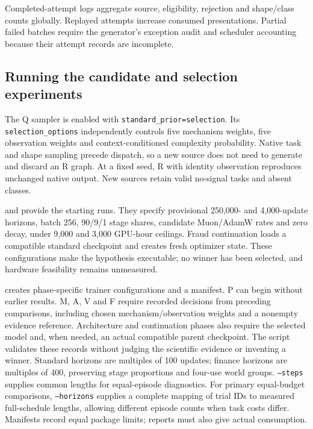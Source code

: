 \documentclass[11pt]{article}
\begin{document}
Completed-attempt logs aggregate source, eligibility, rejection and shape/class counts globally. Replayed attempts increase consumed presentations. Partial failed batches require the generator's exception audit and scheduler accounting because their attempt records are incomplete.

\subsection{Running the candidate and selection experiments}
\label{sec:selection-running}

The Q sampler is enabled with \texttt{standard\_prior=selection}. Its \texttt{selection\_options} independently controls five mechanism weights, five observation weights and context-conditioned complexity probability. Native task and shape sampling precede dispatch, so a new source does not need to generate and discard an R graph. At a fixed seed, R with identity observation reproduces unchanged native output. New sources retain valid no-signal tasks and absent classes.

 and  provide the starting runs. They specify provisional 250,000- and 4,000-update horizons, batch 256, 90/9/1 stage shares, candidate Muon/AdamW rates and zero decay, under 9,000 and 3,000 GPU-hour ceilings. Fraud continuation loads a compatible standard checkpoint and creates fresh optimizer state. These configurations make the hypothesis executable; no winner has been selected, and hardware feasibility remains unmeasured.

 creates phase-specific trainer configurations and a manifest. P can begin without earlier results. M, A, V and F require recorded decisions from preceding comparisons, including chosen mechanism/observation weights and a nonempty evidence reference. Architecture and continuation phases also require the selected model and, when needed, an actual compatible parent checkpoint. The script validates these records without judging the scientific evidence or inventing a winner. Standard horizons are multiples of 100 updates; finance horizons are multiples of 400, preserving stage proportions and four-use world groups. \texttt{--steps} supplies common lengths for equal-episode diagnostics. For primary equal-budget comparisons, \texttt{--horizons} supplies a complete mapping of trial IDs to measured full-schedule lengths, allowing different episode counts when task costs differ. Manifests record equal package limits; reports must also give actual consumption.
\end{document}
